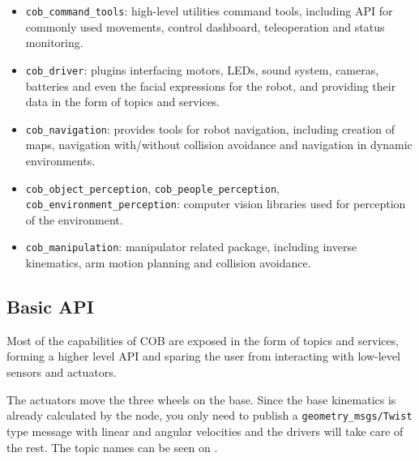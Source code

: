 \begin{itemize}
\item \texttt{cob\_command\_tools}: high-level utilities command tools, including API for commonly used movements, control dashboard, teleoperation and status monitoring.
\item \texttt{cob\_driver}: plugins interfacing motors, LEDs, sound system, cameras, batteries and even the facial expressions for the robot, and providing their data in the form of topics and services.
\item \texttt{cob\_navigation}: provides tools for robot navigation, including creation of maps, navigation with/without collision avoidance and navigation in dynamic environments.
\item \texttt{cob\_object\_perception}, \texttt{cob\_people\_perception}, \texttt{cob\_environment\_perception}: computer vision libraries used for perception of the environment.
\item \texttt{cob\_manipulation}: manipulator related package, including inverse kinematics, arm motion planning and collision avoidance.
\end{itemize}

\subsection{Basic API}

Most of the capabilities of COB are exposed in the form of topics and services, forming a higher level API and sparing the user from interacting with low-level sensors and actuators.

The actuators move the three wheels on the base. Since the base kinematics is already calculated by the node, you only need to publish a \texttt{geometry\_msgs/Twist} type message with linear and angular velocities and the drivers will take care of the rest. The topic names can be seen on .

\begin{table}[!ht]
\caption{Base command API.} \label{tab:baseapi}
\renewcommand*{\arraystretch}{1.1}
\end{table}

